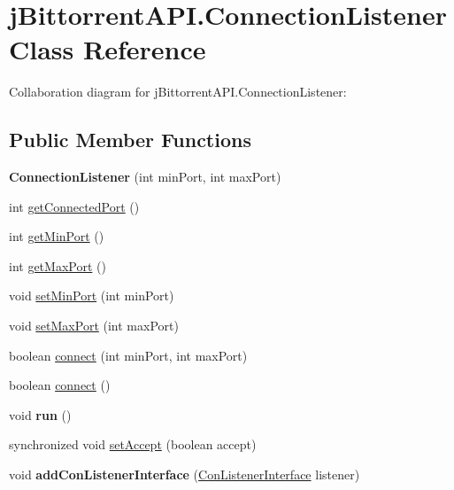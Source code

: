 \hypertarget{classj_bittorrent_a_p_i_1_1_connection_listener}{
\section{jBittorrentAPI.ConnectionListener Class Reference}
\label{classj_bittorrent_a_p_i_1_1_connection_listener}
}
Collaboration diagram for jBittorrentAPI.ConnectionListener:\subsection*{Public Member Functions}
\begin{DoxyCompactItemize}
\item 
\hypertarget{classj_bittorrent_a_p_i_1_1_connection_listener_a7e1f5aaad1ed26e707bc91b7e913eff7}{
{\bfseries ConnectionListener} (int minPort, int maxPort)}
\label{classj_bittorrent_a_p_i_1_1_connection_listener_a7e1f5aaad1ed26e707bc91b7e913eff7}

\item 
int \hyperlink{classj_bittorrent_a_p_i_1_1_connection_listener_ac20a333270dedd9da96f17b7c51b712a}{getConnectedPort} ()
\item 
int \hyperlink{classj_bittorrent_a_p_i_1_1_connection_listener_abbc53be91686fc734c3614599dc05b61}{getMinPort} ()
\item 
int \hyperlink{classj_bittorrent_a_p_i_1_1_connection_listener_a2955a07eb43d334e278b01215b93b830}{getMaxPort} ()
\item 
void \hyperlink{classj_bittorrent_a_p_i_1_1_connection_listener_a4f09e7b9a9958e47a474c16d063e610f}{setMinPort} (int minPort)
\item 
void \hyperlink{classj_bittorrent_a_p_i_1_1_connection_listener_a2347c592c92fadb16db0670aaa7e4bc6}{setMaxPort} (int maxPort)
\item 
boolean \hyperlink{classj_bittorrent_a_p_i_1_1_connection_listener_a386740f5e18aeeeae7c43c9debe0744e}{connect} (int minPort, int maxPort)
\item 
boolean \hyperlink{classj_bittorrent_a_p_i_1_1_connection_listener_a973370bdec55e913c544902f89512c93}{connect} ()
\item 
\hypertarget{classj_bittorrent_a_p_i_1_1_connection_listener_a69a752f4959012314b32c5647001053a}{
void {\bfseries run} ()}
\label{classj_bittorrent_a_p_i_1_1_connection_listener_a69a752f4959012314b32c5647001053a}

\item 
synchronized void \hyperlink{classj_bittorrent_a_p_i_1_1_connection_listener_a9ce7e9af2b58633fd8ba05816ba8eaa0}{setAccept} (boolean accept)
\item 
\hypertarget{classj_bittorrent_a_p_i_1_1_connection_listener_aa02f6fee7bbec9d68cb4a7ea377350ff}{
void {\bfseries addConListenerInterface} (\hyperlink{interfacej_bittorrent_a_p_i_1_1_con_listener_interface}{ConListenerInterface} listener)}
\label{classj_bittorrent_a_p_i_1_1_connection_listener_aa02f6fee7bbec9d68cb4a7ea377350ff}


\end{DoxyCompactItemize}
